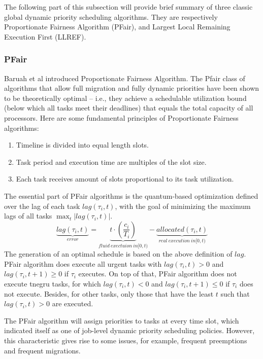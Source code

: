 \documentclass[preprint,12pt]{elsarticle}
\begin{document}
The following part of this subsection will provide brief summary of three
classic global dynamic priority scheduling algorithms. They are respectively 
Proportionate Fairness Algorithm (PFair), and Largest Local Remaining Execution
First (LLREF). 

\subsubsection{PFair}
Baruah et al \cite{baruah1996proportionate} introduced Proportionate Fairness
Algorithm. 
The Pfair class of algorithms that allow full migration and fully dynamic
priorities have been shown to be theoretically optimal -- i.e., they achieve a
schedulable utilization bound (below which all tasks meet their deadlines)
that equals the total capacity of all processors. Here are some fundamental
principles of Proportionate Fairness algorithms: 

\begin{enumerate}
    \item Timeline is divided into equal length slots. 
    \item Task period and execution time are multiples of the slot size. 
    \item Each task receives amount of slots proportional to its task
        utilization. 
\end{enumerate}

The essential part of PFair algorithms is the quantum-based optimization
defined over the lag of each task $lag(\tau_i, t)$, with the goal of
minimizing the maximum lags of all tasks $\max_t|lag(\tau_i, t)|$.
\begin{equation}
    \underbrace{lag(\tau_i, t)}_{error} = 
    \underbrace{t \cdot (\frac{c_i}{T_i})}_{fluid\ exectuion\ in [0,t)} 
    - \underbrace{allocated(\tau_i, t)}_{real\ execution\ in [0,t)}
\end{equation}
The generation of an optimal schedule is based on the above definition of
$lag$. PFair algorithm does execute all urgent tasks with $lag(\tau_i, t) > 0$
and $lag(\tau_i, t +1) \geq 0$ if $\tau_i$ executes. 
On top of that, PFair algorithm does not execute tnegru tasks, for which
$lag(\tau_i, t) < 0$ and $lag(\tau_i, t+1) \leq 0$ if $\tau_i$ does not execute.  
Besides, for other tasks, only those that have the least $t$ such that
$lag(\tau_i,t) >0$ are executed.

The PFair algorithm will assign priorities to tasks at every time slot, which
indicated itself as one of job-level dynamic priority scheduling policies. 
However, this characteristic gives rise to some issues, for example, frequent
preemptions and frequent migrations.
\end{document}
